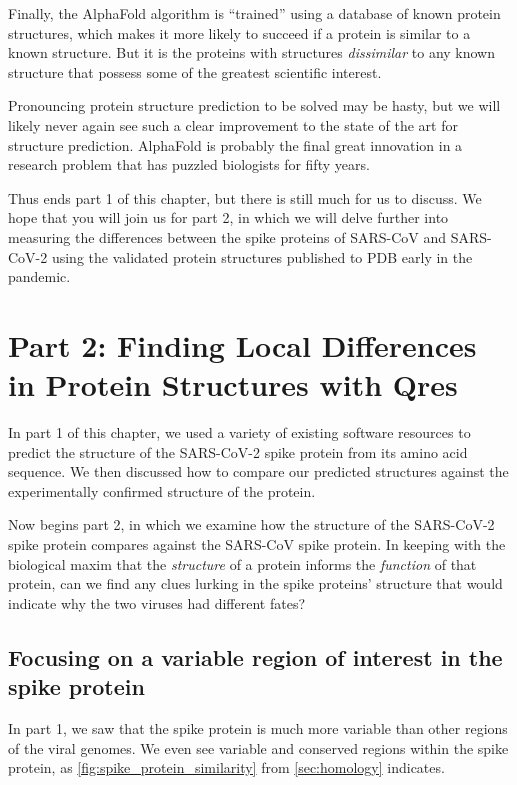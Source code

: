 Finally, the AlphaFold algorithm is ``trained'' using a database of known protein structures, which makes it more likely to succeed if a protein is similar to a known structure. But it is the proteins with structures \textit{dissimilar} to any known structure that possess some of the greatest scientific interest.

Pronouncing protein structure prediction to be solved may be hasty, but we will likely never again see such a clear improvement to the state of the art for structure prediction. AlphaFold is probably the final great innovation in a research problem that has puzzled biologists for fifty years.

Thus ends part 1 of this chapter, but there is still much for us to discuss. We hope that you will join us for part 2, in which we will delve further into measuring the differences between the spike proteins of SARS-CoV and SARS-CoV-2 using the validated protein structures published to PDB early in the pandemic.\\

\FloatBarrier
{}

\section{Part 2: Finding Local Differences in Protein Structures with Qres}
\label{sec:multiseq}

In part 1 of this chapter, we used a variety of existing software resources to predict the structure of the SARS-CoV-2 spike protein from its amino acid sequence. We then discussed how to compare our predicted structures against the experimentally confirmed structure of the protein.

Now begins part 2, in which we examine how the structure of the SARS-CoV-2 spike protein compares against the SARS-CoV spike protein. In keeping with the biological maxim that the \textit{structure} of a protein informs the \textit{function} of that protein, can we find any clues lurking in the spike proteins' structure that would indicate why the two viruses had different fates?

\FloatBarrier
{}
\subsection{Focusing on a variable region of interest in the spike protein}

In part 1, we saw that the spike protein is much more variable than other regions of the viral genomes. We even see variable and conserved regions within the spike protein, as \autoref{fig:spike_protein_similarity} from \autoref{sec:homology} indicates.

